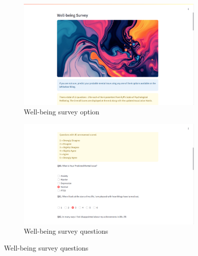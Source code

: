\begin{figure}[h!]
    \centering
    \begin{subfigure}[b]{0.495\textwidth}
        \centering
        \includegraphics[width=\textwidth]{App Images/28 Interface.png}
        \caption*{Well-being survey option}
        \label{fig:wellbeing_questions}
    \end{subfigure}
    \hfill
    \begin{subfigure}[b]{0.495\textwidth}
        \centering
        \includegraphics[width=\textwidth]{App Images/29 Interface.png}
        \caption*{Well-being survey questions}
        \label{fig:wellbeing_result}
    \end{subfigure}
    \label{fig:wellbeing_comparison}
\end{figure}

\vspace{-2em}

